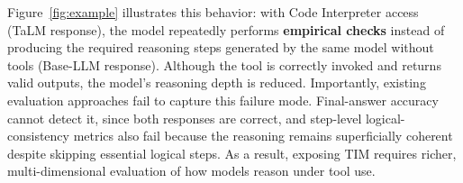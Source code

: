 \documentclass[11pt]{article}
\def \task{\textsc{TIM}\xspace}
\newcommand{\farima}[1]{{\color{orange}Farima: #1}}
\newcommand{\pouya}[1]{{\color{violet}Pouya: #1}}
\begin{document}

Figure~\ref{fig:example} illustrates this behavior: with Code Interpreter access (TaLM response), the model repeatedly performs \textbf{empirical checks} instead of producing the required reasoning steps generated by the same model without tools (Base-LLM response). Although the tool is correctly invoked and returns valid outputs, the model’s reasoning depth is reduced. Importantly, existing evaluation approaches fail to capture this failure mode. Final-answer accuracy cannot detect it, since both responses are correct, and step-level logical-consistency metrics \citep{lightman2023letsverifystepstep, zheng-etal-2025-processbench, xiareasoneval, liu2025enhancingmathematicalreasoninglarge} also fail because the reasoning remains superficially coherent despite skipping essential logical steps. As a result, exposing \task requires richer, multi-dimensional evaluation of how models reason under tool use.


\end{document}
